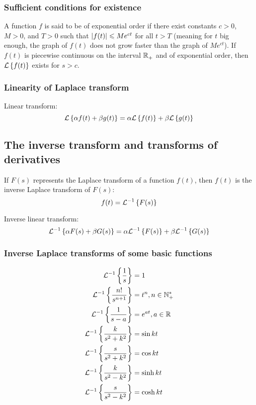 \documentclass[10pt, twocolumn]{article}
\begin{document}
\subsubsection{Sufficient conditions for existence}
A function \(f\) is said to be of exponential order if there exist constants \(c > 0\), \(M > 0\), and \(T > 0\) such that \(\left| f(t) \right| \leqslant Me^{ct}\) for all \(t > T\) (meaning for \(t\) big enough, the graph of \(f(t)\) does not grow faster than the graph of \(Me^{ct}\)).
If \(f(t)\) is piecewise continuous on the interval \(\mathbb{R}_{+}^{} \) and of exponential order, then \(\mathcal{L}\left\{ f(t) \right\}\) exists for \(s > c\).


\subsubsection{Linearity of Laplace transform}
Linear transform:
\[
  \mathcal{L}\left\{ \alpha f(t) + \beta g(t) \right\} = \alpha \mathcal{L}\left\{ f(t) \right\} + \beta \mathcal{L}\left\{ g(t) \right\}
\]


\subsection{The inverse transform and transforms of derivatives}
If \(F(s)\) represents the Laplace transform of a function \(f(t)\), then \(f(t)\) is the inverse Laplace transform of \(F(s)\):
\[
  f(t) = \mathcal{L}^{-1}\left\{ F(s) \right\}
\]

Inverse linear transform:
\[
  \mathcal{L}^{-1}\left\{ \alpha F(s) + \beta G(s) \right\} = \alpha \mathcal{L}^{-1}\left\{ F(s) \right\} + \beta \mathcal{L}^{-1}\left\{ G(s) \right\}
\]


\subsubsection{Inverse Laplace transforms of some basic functions}
\begin{align*}
  \mathcal{L}^{-1}\left\{ \frac{1}{s} \right\}          & = 1                         \\
  \mathcal{L}^{-1}\left\{ \frac{n!}{s^{n + 1}} \right\} & = t^n, n \in \mathbb{N}_{+}^{*}  \\
  \mathcal{L}^{-1}\left\{ \frac{1}{s - a} \right\}      & = e^{at}, a \in \mathbb{R}_{}^{} \\
  \mathcal{L}^{-1}\left\{ \frac{k}{s^2 + k^2} \right\}  & = \sin{kt}                  \\
  \mathcal{L}^{-1}\left\{ \frac{s}{s^2 + k^2} \right\}  & = \cos{kt}                  \\
  \mathcal{L}^{-1}\left\{ \frac{k}{s^2 - k^2} \right\}  & = \sinh{kt}                 \\
  \mathcal{L}^{-1}\left\{ \frac{s}{s^2 - k^2} \right\}  & = \cosh{kt}                 \\
\end{align*}
\end{document}
